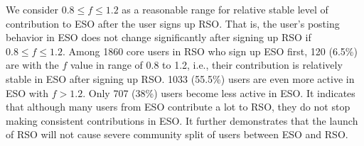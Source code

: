 We consider $0.8 \leq f \leq 1.2$ as a reasonable range for relative stable level of contribution to ESO after the user signs up RSO.
That is, the user's posting behavior in ESO does not change significantly after signing up RSO if $0.8 \leq f \leq 1.2$.
Among 1860 core users in RSO who sign up ESO first, 120 (6.5\%) are with the $f$ value in range of 0.8 to 1.2, i.e., their contribution is relatively stable in ESO after signing up RSO.
1033 (55.5\%) users are even more active in ESO with $f>1.2$. 
Only 707 (38\%) users become less active in ESO.
It indicates that although many users from ESO contribute a lot to RSO, they do not stop making consistent contributions in ESO.
It further demonstrates that the launch of RSO will not cause severe community split of users between ESO and RSO. 

